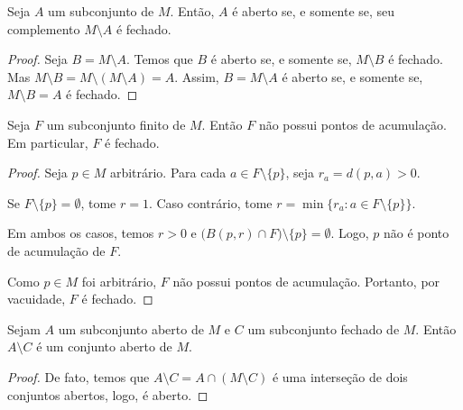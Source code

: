 \begin{corollary}
    Seja $A$ um subconjunto de $M$.
    Então, $A$ é aberto se, e somente se, seu complemento $M\setminus A$ é fechado.
\end{corollary}
\begin{proof}
    Seja $B=M\setminus A$.
    Temos que $B$ é aberto se, e somente se, $M\setminus B$ é fechado.
    Mas $M\setminus B = M\setminus (M\setminus A) = A$.
    Assim, $B=M\setminus A$ é aberto se, e somente se, $M\setminus B = A$ é fechado.
\end{proof}

\begin{proposition}
    Seja $F$ um subconjunto finito de $M$.
    Então $F$ não possui pontos de acumulação.
    Em particular, $F$ é fechado.
\end{proposition}
\begin{proof}
    Seja $p\in M$ arbitrário.
    Para cada $a\in F\setminus\{p\}$, seja $r_a=d(p,a)>0$.

    Se $F\setminus\{p\}=\emptyset$, tome $r=1$.
    Caso contrário, tome $r=\min\{r_a:a\in F\setminus\{p\}\}$.

    Em ambos os casos, temos $r>0$ e $\bigl(B(p,r)\cap F\bigr)\setminus\{p\}=\emptyset$.
    Logo, $p$ não é ponto de acumulação de $F$.

    Como $p\in M$ foi arbitrário, $F$ não possui pontos de acumulação.
    Portanto, por vacuidade, $F$ é fechado.
\end{proof}

\begin{proposition}
    Sejam $A$ um subconjunto aberto de $M$ e $C$ um subconjunto fechado de $M$.
    Então $A\setminus C$ é um conjunto aberto de $M$.
\end{proposition}
\begin{proof}
    De fato, temos que $A\setminus C = A\cap(M\setminus C)$ é uma interseção de dois conjuntos abertos, logo, é aberto.
\end{proof}

